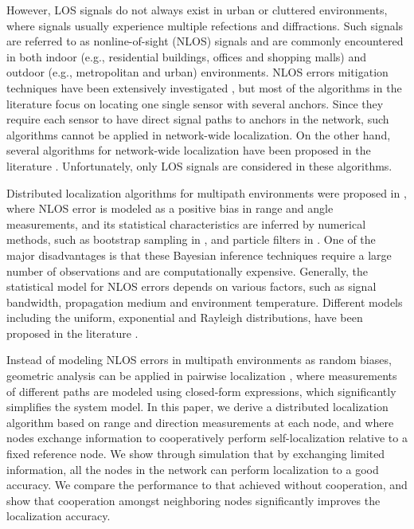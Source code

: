 \documentclass[10pt, twocolumn, final]{IEEEtran}
\begin{document}
However, LOS signals do not always exist in urban or cluttered environments, where signals usually experience multiple refections and diffractions. Such signals are referred to as nonline-of-sight (NLOS) signals and are commonly encountered in both indoor (e.g., residential buildings, offices and shopping malls) and outdoor (e.g., metropolitan and urban) environments. NLOS errors mitigation techniques have been extensively investigated \cite{Guvenc2009, Al-Jazzar2007, Cong2005, Al-Jazzar2009, Xie2009, Miao2007, Seow2008}, but most of the algorithms in the literature focus on locating one single sensor with several anchors. Since they require each sensor to have direct signal paths to anchors in the network, such algorithms cannot be applied in network-wide localization. On the other hand, several algorithms for network-wide localization have been proposed in the literature \cite{Biswas2006, Tseng2007, Srirangarajan2008, Wymeersch2009, Ihler2005}. Unfortunately, only LOS signals are considered in these algorithms.

Distributed localization algorithms for multipath environments were proposed in \cite{Ananthasubramaniam2008,Ekambaram2010}, where NLOS error is modeled as a positive bias in range and angle measurements, and its statistical characteristics are inferred by numerical methods, such as bootstrap sampling in \cite{Ananthasubramaniam2008}, and particle filters in \cite{Ekambaram2010}. One of the major disadvantages is that these Bayesian inference techniques require a large number of observations and are computationally expensive. Generally, the statistical model for NLOS errors depends on various factors, such as signal bandwidth, propagation medium and environment temperature. Different models including the uniform, exponential and Rayleigh distributions, have been proposed in the literature \cite{Pedersen2000,Zekavat2011}.

Instead of modeling NLOS errors in multipath environments as random biases, geometric analysis can be applied in pairwise localization \cite{Xie2009,Miao2007,Seow2008}, where measurements of different paths are modeled using closed-form expressions, which significantly simplifies the system model. In this paper, we derive a distributed localization algorithm based on range and direction measurements at each node, and where nodes exchange information to cooperatively perform self-localization relative to a fixed reference node. We show through simulation that by exchanging limited information, all the nodes in the network can perform localization to a good accuracy. We compare the performance to that achieved without cooperation, and show that cooperation amongst neighboring nodes significantly improves the localization accuracy.
\end{document}
